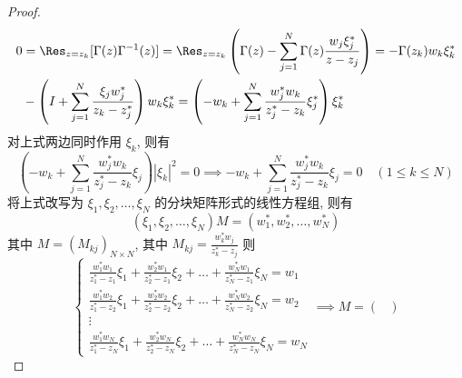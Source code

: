 \begin{proof}
    \begin{equation}
        \begin{aligned}
            0 & = \Res_{z = z_{k}} [\Gamma(z)\Gamma^{-1}(z)] = \Res_{z = z_{k}} \left( \Gamma(z) - \sum_{j = 1}^{N} \Gamma(z)\frac{w_{j}\xi_{j}^{*}}{z- z_{j}} \right) = - \Gamma(z_{k}) w_{k} \xi_{k}^{*}                      \\
              & - \left( I + \sum_{j = 1}^{N} \frac{\xi_{j}w_{j}^{*}}{z_{k} - z_{j}^{*}} \right) w_{k} \xi_{k}^{*} = \left( - w_{k} + \sum_{j = 1}^{N} \frac{w_{j}^{*}w_{k}}{z_{j}^{*} - z_{k}} \xi_{j}^{*} \right) \xi_{k}^{*}
        \end{aligned}
    \end{equation}
    对上式两边同时作用 $ \xi_{k} $, 则有
    \begin{equation}
        \left( - w_{k} + \sum_{j = 1}^{N} \frac{w_{j}^{*}w_{k}}{z_{j}^{*} - z_{k}} \xi_{j} \right) | \xi_{k} |^{2} = 0 \implies  - w_{k} + \sum_{j = 1}^{N} \frac{w_{j}^{*}w_{k}}{z_{j}^{*} - z_{k}} \xi_{j} = 0 \quad (1 \leq k \leq N)
    \end{equation}
    将上式改写为 $ \xi_{1}, \xi_{2}, \dots, \xi_{N} $ 的分块矩阵形式的线性方程组, 则有
    \begin{equation}
        (\xi_{1}, \xi_{2}, \dots, \xi_{N}) M =  (w_{1}^{*}, w_{2}^{*}, \dots, w_{N}^{*})
    \end{equation}
    其中 $ M = (M_{kj})_{N \times N} $, 其中 $ M_{kj} = \frac{w_{k}^{*}w_{j}}{z_{k}^{*} - z_{j}} $ 则
    \begin{equation}
        \begin{cases}
            \frac{w_{1}^{*}w_{1}}{z_{1}^{*}- z_{1}} \xi_{1} + \frac{w_{2}^{*}w_{1}}{z_{2}^{*} - z_{1}} \xi_{2} + \dots + \frac{w_{N}^{*}w_{1}}{z_{N}^{*} - z_{1}} \xi_{N} = w_{1} \\
            \frac{w_{1}^{*}w_{2}}{z_{1}^{*}- z_{2}} \xi_{1} + \frac{w_{2}^{*}w_{2}}{z_{2}^{*} - z_{2}} \xi_{2} + \dots + \frac{w_{N}^{*}w_{2}}{z_{N}^{*} - z_{2}} \xi_{N} = w_{2} \\
            \vdots                                                                                                                                                                \\
            \frac{w_{1}^{*}w_{N}}{z_{1}^{*}- z_{N}} \xi_{1} + \frac{w_{2}^{*}w_{N}}{z_{2}^{*} - z_{N}} \xi_{2} + \dots + \frac{w_{N}^{*}w_{N}}{z_{N}^{*} - z_{N}} \xi_{N} = w_{N}
        \end{cases}
        \implies M = \begin{pmatrix}

\end{pmatrix}
\end{equation}
\end{proof}
